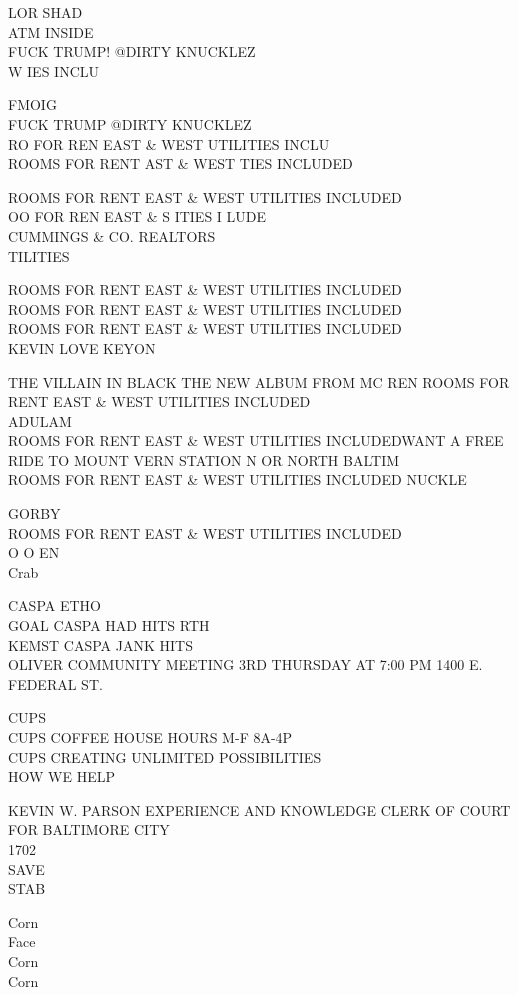 \documentclass[10pt,letterpaper]{article}
\begin{document}
LOR SHAD\\
ATM INSIDE\\
FUCK TRUMP!  @DIRTY KNUCKLEZ\\
W IES INCLU

FMOIG\\
FUCK TRUMP @DIRTY KNUCKLEZ\\
RO FOR REN EAST \& WEST UTILITIES INCLU\\
ROOMS FOR RENT AST \& WEST TIES INCLUDED

ROOMS FOR RENT EAST \& WEST UTILITIES INCLUDED\\
OO FOR REN EAST \& S ITIES I LUDE\\
CUMMINGS \& CO. REALTORS\\
TILITIES

ROOMS FOR RENT EAST \& WEST UTILITIES INCLUDED\\
ROOMS FOR RENT EAST \& WEST UTILITIES INCLUDED\\
ROOMS FOR RENT EAST \& WEST UTILITIES INCLUDED\\
KEVIN LOVE KEYON

THE VILLAIN IN BLACK THE NEW ALBUM FROM MC REN ROOMS FOR RENT EAST \& WEST UTILITIES INCLUDED\\
ADULAM\\
ROOMS FOR RENT EAST \& WEST UTILITIES INCLUDEDWANT A FREE RIDE TO MOUNT VERN STATION N OR NORTH BALTIM\\
ROOMS FOR RENT EAST \& WEST UTILITIES INCLUDED NUCKLE

GORBY\\
ROOMS FOR RENT EAST \& WEST UTILITIES INCLUDED\\
O O EN\\
Crab

CASPA ETHO\\
GOAL CASPA HAD HITS RTH\\
KEMST CASPA JANK HITS\\
OLIVER COMMUNITY MEETING 3RD THURSDAY AT 7:00 PM 1400 E. FEDERAL ST.

CUPS\\
CUPS COFFEE HOUSE HOURS M{-}F 8A{-}4P\\
CUPS CREATING UNLIMITED POSSIBILITIES\\
HOW WE HELP

KEVIN W. PARSON EXPERIENCE AND KNOWLEDGE CLERK OF COURT FOR BALTIMORE CITY\\
1702\\
SAVE\\
STAB

Corn\\
Face\\
Corn\\
Corn
\end{document}
